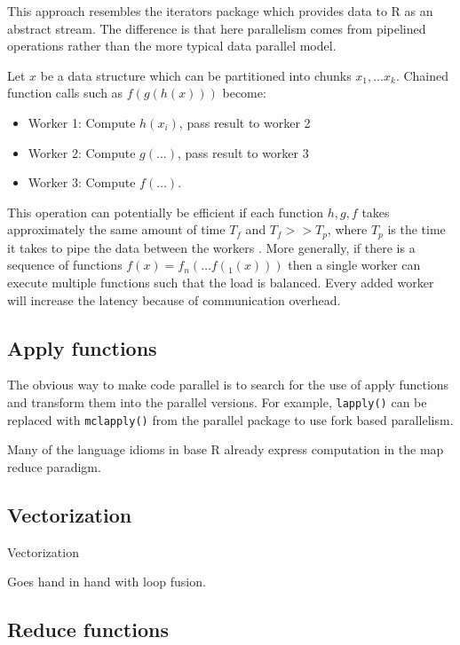 \documentclass[12pt]{article}
\begin{document}
This approach resembles the iterators package \cite{R-iterators} which
provides data to R as an abstract stream. The difference is that here
parallelism comes from pipelined operations rather than the more typical
data parallel model.

Let $x$ be a data structure which can be partitioned into chunks $x_1,
\dots x_k$. Chained function calls such as $f(g(h(x)))$ become:

\begin{itemize}
    \item Worker 1: Compute $h(x_i)$, pass result to worker 2
    \item Worker 2: Compute $g(\dots)$, pass result to worker 3
    \item Worker 3: Compute $f(\dots)$.
\end{itemize}

This operation can potentially be efficient if each function $h, g,
f$ takes approximately the same amount of time $T_f$ and $T_f >> T_p$,
where $T_p$ is the time it takes to pipe the data between the 
workers \cite{arnold2015iotools}. More generally, if there is a sequence of
functions $f(x) = f_n(\dots f(_1(x)))$ then a single worker can execute
multiple functions such that the load is balanced. Every added worker will
increase the latency because of communication overhead.

\subsection{Apply functions}

The obvious way to make code parallel is to search for the use of
apply functions and transform them into the parallel versions. For example, 
\texttt{lapply()} can be replaced with \texttt{mclapply()} from the
parallel package to use fork based parallelism.

Many of the language idioms in base R already express computation in the
map reduce paradigm.

\subsection{Vectorization}

Vectorization

Goes hand in hand with loop fusion.


\subsection{Reduce functions}
\end{document}

